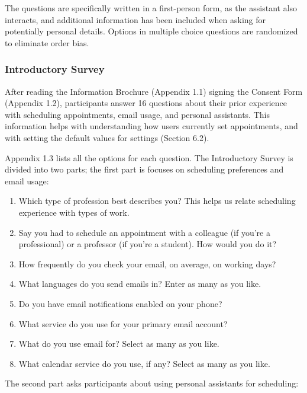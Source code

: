 \documentclass{article}
\begin{document}
The questions are specifically written in a first-person form, as the assistant also interacts, and additional information has been included when asking for potentially personal details. Options in multiple choice questions are randomized to eliminate order bias.

\subsubsection{Introductory Survey}

After reading the Information Brochure (Appendix 1.1) signing the Consent Form (Appendix 1.2), participants answer 16 questions about their prior experience with scheduling appointments, email usage, and personal assistants. This information helps with understanding how users currently set appointments, and with setting the default values for settings (Section 6.2).

Appendix 1.3 lists all the options for each question. The Introductory Survey is divided into two parts; the first part is focuses on scheduling preferences and email usage:

\begin{enumerate}
	\item Which type of profession best describes you? This helps us relate scheduling experience with types of work.
	\item Say you had to schedule an appointment with a colleague (if you're a professional) or a professor (if you're a student). How would you do it?
	\item How frequently do you check your email, on average, on working days?
	\item What languages do you send emails in? Enter as many as you like.
	\item Do you have email notifications enabled on your phone?
	\item What service do you use for your primary email account?
	\item What do you use email for? Select as many as you like.
	\item What calendar service do you use, if any? Select as many as you like.
\end{enumerate}

The second part asks participants about using personal assistants for scheduling:
\end{document}
